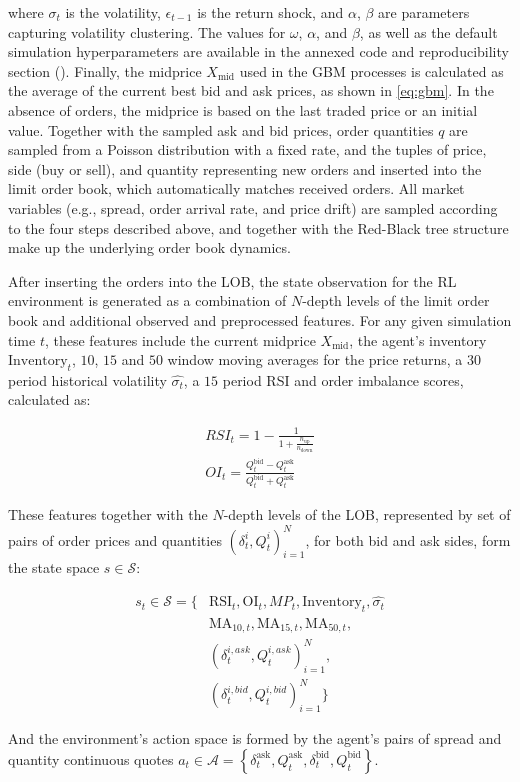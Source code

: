 \documentclass[11pt]{article}
\begin{document}
    where \( \sigma_t \) is the volatility, \( \epsilon_{t-1} \) is the return shock, 
    and \( \alpha \), \( \beta \) are parameters capturing volatility clustering.
    The values for $\omega$, $\alpha$, and $\beta$, as well as the default simulation hyperparameters are
    available in the annexed code and reproducibility section ().
    Finally, the midprice \( X_{\text{mid}} \) used in the GBM processes is calculated as the average of the current best bid and ask prices,
    as shown in \cref{eq:gbm}.
    In the absence of orders, the midprice is based on the last traded price or an initial value.
    Together with the sampled ask and bid prices, order quantities \( q \) are sampled from a Poisson distribution with a fixed rate,
    and the tuples of price, side (buy or sell), and quantity representing new orders and inserted into the limit order book,
    which automatically matches received orders.
    All market variables (e.g., spread, order arrival rate, and price drift) are sampled according to the four steps described above,
    and together with the Red-Black tree structure make up the underlying order book dynamics.

    After inserting the orders into the LOB, 
    the state observation for the RL environment is generated as a combination of $N$-depth levels of the limit order book 
    and additional observed and preprocessed features.
    For any given simulation time $t$, these features include the current midprice $X_\text{mid}$, the agent's inventory $\text{Inventory}_t$, 
    $10$, $15$ and $50$ window moving averages for the price returns, a $30$ period historical volatility $\hat{\sigma_t}$,
    a $15$ period RSI and order imbalance scores, calculated as:

        \begin{align}
        \label{eq:rsi}
            RSI_t = 1 - \frac{1}{1 + \frac{n_\text{up}}{n_\text{down}}}\\
            OI_t = \frac{Q_t^{\text{bid}} - Q_t^{\text{ask}}}{Q_t^{\text{bid}} + Q_t^{\text{ask}}}
        \end{align}
    
    These features together with the $N$-depth levels of the LOB, 
    represented by set of pairs of order prices and quantities $(\delta_t^{i}, Q_t^{i})_{i=1}^{N}$, 
    for both bid and ask sides,
    form the state space $s\in \mathcal{S}$:

    \begin{equation}
        \begin{aligned}
            s_{t} \in \mathcal{S} = \big\{ &\text{RSI}_t, \text{OI}_t, MP_{t}, \text{Inventory}_t, \hat{\sigma_t}\\
            & \text{MA}_{10, t}, \text{MA}_{15, t}, \text{MA}_{50, t}, \\
            & (\delta_t^{i, ask}, Q_t^{i, ask})_{i=1}^{N}, \\
            & (\delta_t^{i, bid}, Q_t^{i, bid})_{i=1}^{N} \big\}
        \end{aligned}\label{eq:equation}
    \end{equation}

    And the environment's action space is formed by the agent's pairs of spread and quantity continuous quotes
    $a_t \in \mathcal{A} = \left\{ \delta_t^\text{ask}, Q_t^\text{ask},  \delta_t^\text{bid}, Q_t^\text{bid} \right\}$.
\end{document}
